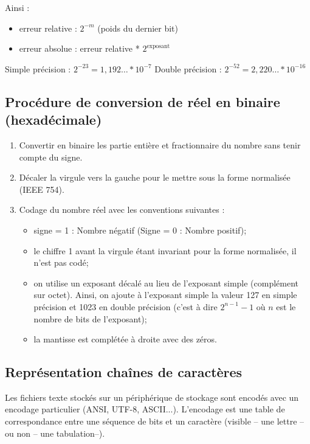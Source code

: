 \documentclass[10pt,fleqn]{article} %
\begin{document}
\vspace{.25cm}

Ainsi : 
\begin{itemize}
\item erreur relative : $2^{-m}$ (poids du dernier bit)
\item erreur absolue : erreur relative * $2^{\text{exposant}}$
\end{itemize}

Simple précision :  	$2^{- 23} = 1,192 … * 10^{- 7}$ 
Double précision :  	$2^{- 52} = 2,220 … * 10^{- 16}$


\subsection*{Procédure de conversion de réel en binaire (hexadécimale) }

\begin{methode}
\begin{enumerate}
\item Convertir en binaire les partie entière et fractionnaire du nombre sans tenir compte du signe.
\item Décaler la virgule vers la gauche pour le mettre sous la forme normalisée (IEEE 754).
\item Codage du nombre réel avec les conventions suivantes : 
\begin{itemize}
\item signe = 1 : Nombre négatif 	(Signe = 0 : Nombre positif);
\item le chiffre 1 avant la virgule étant invariant pour la forme normalisée, il n’est pas codé;
\item on utilise un exposant décalé au lieu de l’exposant simple (complément sur octet). Ainsi, on ajoute à l’exposant simple la valeur 127 en simple précision et 1023 en double précision (c’est à dire $2^{n-1}-1$ où $n$ est le nombre de bits de l’exposant);
\item la mantisse est complétée à droite avec des zéros.
\end{itemize}
\end{enumerate}
\end{methode}

\subsection*{Représentation chaînes de caractères}
Les fichiers texte stockés sur un périphérique de stockage sont encodés avec un encodage particulier (ANSI, UTF-8, ASCII...). L'encodage est une table de correspondance entre une séquence de bits et un caractère (visible -- une lettre -- ou non -- une tabulation--).
\end{document}
